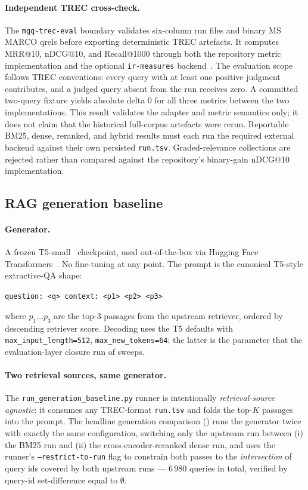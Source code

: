 \documentclass[11pt,a4paper]{article}
\makeatletter
\newcommand{\fdev}{6\,980}
\newcommand{\mrr}{MRR@10}
\newcommand{\ndcg}{nDCG@10}
\newcommand{\recallK}{Recall@1000}
\newcommand{\bmtwofive}{BM25}
\makeatother
\begin{document}
\paragraph{Independent TREC cross-check.}
The \texttt{mgq-trec-eval} boundary validates six-column run files and
binary MS MARCO qrels before exporting deterministic TREC artefacts.  It computes
\mrr{}, \ndcg{}, and \recallK{} through both the repository metric
implementation and the optional \texttt{ir-measures}
backend~\cite{macavaney2022irmeasures}.  The evaluation scope follows
TREC conventions: every query with at least one positive judgment
contributes, and a judged query absent from the run receives zero.  A
committed two-query fixture yields absolute delta 0 for all three
metrics between the two implementations.  This result validates the
adapter and metric semantics only; it does not claim that the
historical full-corpus artefacts were rerun.  Reportable \bmtwofive{},
dense, reranked, and hybrid results must each run the required external
backend against their own persisted \texttt{run.tsv}.
Graded-relevance collections are rejected rather than compared against
the repository's binary-gain \ndcg{} implementation.

\subsection{RAG generation baseline}
\label{sec:w3}

\paragraph{Generator.}  A frozen T5-small~\cite{raffel2020t5}
checkpoint, used out-of-the-box via Hugging Face
Transformers~\cite{wolf2020transformers}.  No fine-tuning at any
point.  The prompt is the canonical T5-style extractive-QA shape:
\begin{center}
  \verb|question: <q> context: <p1> <p2> <p3>|
\end{center}
where $p_1\ldots p_3$ are the top-3 passages from the upstream
retriever, ordered by descending retriever score.  Decoding uses the
T5 defaults with \texttt{max\_input\_length=512},
\texttt{max\_new\_tokens=64}; the latter is the parameter that the
evaluation-layer closure run of  sweeps.

\paragraph{Two retrieval sources, same generator.}  The
\texttt{run\_generation\_baseline.py} runner is intentionally
\emph{retrieval-source agnostic}: it consumes any TREC-format
\texttt{run.tsv} and folds the top-$K$ passages into the prompt.
The headline generation comparison () runs the
generator twice with exactly the same configuration, switching only
the upstream run between (i) the \bmtwofive{} run and (ii) the
cross-encoder-reranked dense run, and uses the runner's
\texttt{--restrict-to-run} flag to constrain both passes to the
\emph{intersection} of query ids covered by both upstream runs ---
\fdev{} queries in total, verified by query-id set-difference equal
to $\emptyset$.
\end{document}
